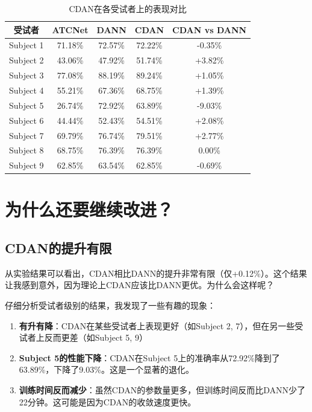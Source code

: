 \documentclass[12pt,a4paper]{ctexart}
\begin{document}
\begin{table}[H]
\centering
\caption{CDAN在各受试者上的表现对比}
\label{tab:subject_wise_cdan}
\begin{tabular}{ccccc}
\toprule
\textbf{受试者} & \textbf{ATCNet} & \textbf{DANN} & \textbf{CDAN} & \textbf{CDAN vs DANN} \\
\midrule
Subject 1 & 71.18\% & 72.57\% & 72.22\% & -0.35\% \\
Subject 2 & 43.06\% & 47.92\% & 51.74\% & +3.82\% \\
Subject 3 & 77.08\% & 88.19\% & 89.24\% & +1.05\% \\
Subject 4 & 55.21\% & 67.36\% & 68.75\% & +1.39\% \\
Subject 5 & 26.74\% & 72.92\% & 63.89\% & -9.03\% \\
Subject 6 & 44.44\% & 52.43\% & 54.51\% & +2.08\% \\
Subject 7 & 69.79\% & 76.74\% & 79.51\% & +2.77\% \\
Subject 8 & 68.75\% & 76.39\% & 76.39\% & 0.00\% \\
Subject 9 & 62.85\% & 63.54\% & 62.85\% & -0.69\% \\
\bottomrule
\end{tabular}
\end{table}

\section{为什么还要继续改进？}

\subsection{CDAN的提升有限}

从实验结果可以看出，CDAN相比DANN的提升非常有限（仅+0.12\%）。这个结果让我感到意外，因为理论上CDAN应该比DANN更优。为什么会这样呢？

仔细分析受试者级别的结果，我发现了一些有趣的现象：

\begin{enumerate}
    \item \textbf{有升有降}：CDAN在某些受试者上表现更好（如Subject 2, 7），但在另一些受试者上反而更差（如Subject 5, 9）
    
    \item \textbf{Subject 5的性能下降}：CDAN在Subject 5上的准确率从72.92\%降到了63.89\%，下降了9.03\%。这是一个显著的退化。
    
    \item \textbf{训练时间反而减少}：虽然CDAN的参数量更多，但训练时间反而比DANN少了22分钟。这可能是因为CDAN的收敛速度更快。
\end{enumerate}
\end{document}

